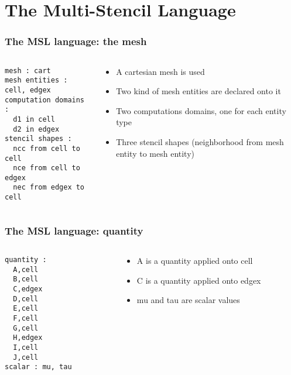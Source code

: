 \documentclass{beamer}
\begin{document}
\section{The Multi-Stencil Language}
\begin{frame}[fragile]
\frametitle{The MSL language: the mesh}
\begin{center}
\end{center}
\begin{columns}
\begin{column}{6.5cm}
\begin{lstlisting}[frame=single]
mesh : cart
mesh entities : cell, edgex
computation domains :
  d1 in cell
  d2 in edgex
stencil shapes : 
  ncc from cell to cell
  nce from cell to edgex
  nec from edgex to cell
\end{lstlisting}
\end{column}
\begin{column}{5.5cm}
\begin{itemize}
\item A cartesian mesh is used
\item Two kind of mesh entities are declared onto it
\item Two computations domains, one for each entity type
\item Three stencil shapes (neighborhood from mesh entity to mesh entity)
\end{itemize}
\end{column}
\end{columns}
\end{frame}
\begin{frame}[fragile]
\frametitle{The MSL language: quantity}
\begin{columns}
\begin{column}{5cm}
\begin{lstlisting}[frame=single]
quantity :
  A,cell
  B,cell
  C,edgex
  D,cell
  E,cell
  F,cell
  G,cell
  H,edgex
  I,cell
  J,cell
scalar : mu, tau
\end{lstlisting}
\end{column}
\begin{column}{6cm}
\begin{itemize}
\item A is a quantity applied onto cell
\item C is a quantity applied onto edgex
\item mu and tau are scalar values
\end{itemize}
\end{column}
\end{columns}
\end{frame}
\end{document}
